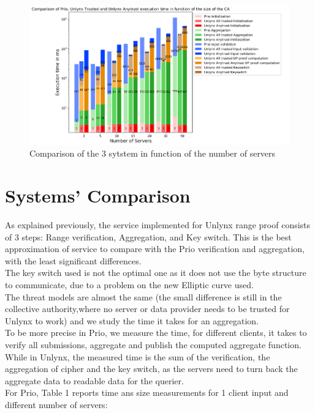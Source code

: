 \documentclass{article}
\begin{document}
\begin{figure}[H]
\centering
\includegraphics[scale=0.7]{img/ComparisonServer.png}
\caption{Comparison of the 3 sytstem in function of the number of servers}
\end{figure}
\section{Systems' Comparison}
As explained previously, the service implemented for Unlynx range proof consists of 3 steps: Range verification, Aggregation, and Key switch. This is the best approximation of service to compare with the Prio verification and aggregation, with the least significant differences.\\
The key switch used is not the optimal one as it does not use the byte structure to communicate, due to a problem on the new Elliptic curve used.\\

The threat models are almost the same (the small difference is still in the collective authority,where no server or data provider needs to be trusted for Unlynx to work) and we study the time it takes for an aggregation.\\
To be more precise in Prio, we measure the time, for different clients, it takes to verify all submissions, aggregate and publish the computed aggregate function.
While in Unlynx, the measured time is the sum of the verification, the aggregation of cipher and the key switch, as the servers need to turn back the aggregate data to readable data for the querier.\\

For Prio, Table 1 reports time ans size measurements for 1 client input and different number of servers:\\
\end{document}
